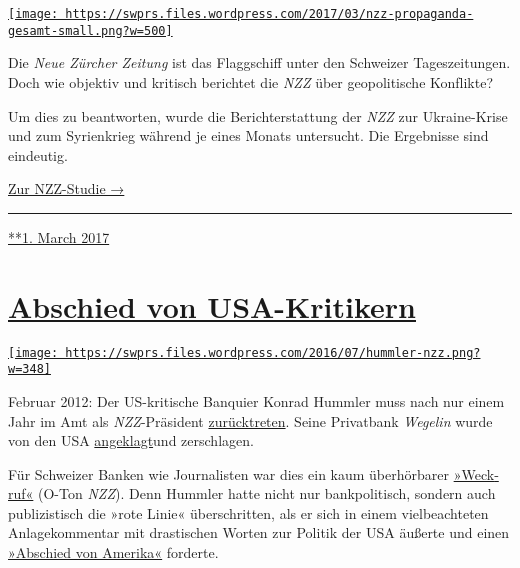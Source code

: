 \href{https://swprs.org/2017/03/01/die-nzz-studie/}{\texttt{[image: https://swprs.files.wordpress.com/2017/03/nzz-propaganda-gesamt-small.png?w=500]}}

Die \emph{Neue Zürcher Zeitung} ist das Flagg­schiff unter den Schweizer
Tages­zei­tungen. Doch wie objektiv und kritisch berichtet die
\emph{NZZ} über geo­politische Konf‌likte?

Um dies zu be­ant­worten, wurde die Bericht­erstattung der \emph{NZZ}
zur Ukraine-Krise und zum Syrien­krieg während je eines Monats
unter­sucht. Die Ergebnisse sind eindeutig.

\href{https://swprs.org/die-nzz-studie/}{Zur NZZ-Studie →}

\begin{center}\rule{0.5\linewidth}{\linethickness}\end{center}

\href{https://swprs.org/2017/03/01/die-nzz-studie/}{**1. March 2017}

\hypertarget{abschied-von-usa-kritikern}{%
\section{\texorpdfstring{\href{https://swprs.org/2017/03/01/abschied-von-usa-kritikern/}{Abschied
von
USA-Kritikern}}{Abschied von USA-Kritikern}}\label{abschied-von-usa-kritikern}}

\href{https://swprs.org/2017/03/01/abschied-von-usa-kritikern/}{\texttt{[image: https://swprs.files.wordpress.com/2016/07/hummler-nzz.png?w=348]}}

Februar 2012: Der US-kritische Banquier Konrad Hummler muss nach nur
einem Jahr im Amt als \emph{NZZ}-Präsi­dent
\href{https://www.tagesanzeiger.ch/wirtschaft/unternehmen-und-konjunktur/Konrad-Hummler-gibt-NZZVRPraesidium-ab/story/25627682}{zurück­treten}.
Seine Privatbank \emph{Wegelin} wurde von den USA
\href{https://www.tagesanzeiger.ch/wirtschaft/unternehmen-und-konjunktur/USA-erhoehen-mit-WegelinKlage-den-Druck/story/25658973}{an­ge­klagt}und
zerschlagen.

Für Schweizer Banken wie Journalisten war dies ein kaum über­hör­ba­rer
\href{http://www.nzz.ch/ein-weckruf-fuer-die-schweiz-1.14608280}{»Weck­ruf«}
(O-Ton \emph{NZZ}). Denn Hummler hatte nicht nur bank­politisch, sondern
auch publi­zistisch die »rote Linie« über­schritten, als er sich in
einem viel­beachteten An­la­ge­kom­men­tar mit dras­ti­schen Worten zur
Po­li­tik der USA äußerte und einen
\href{https://swprs.files.wordpress.com/2016/03/usa_wegelin_kommentar_2009.pdf}{»Abschied
von Amerika«} forderte.


